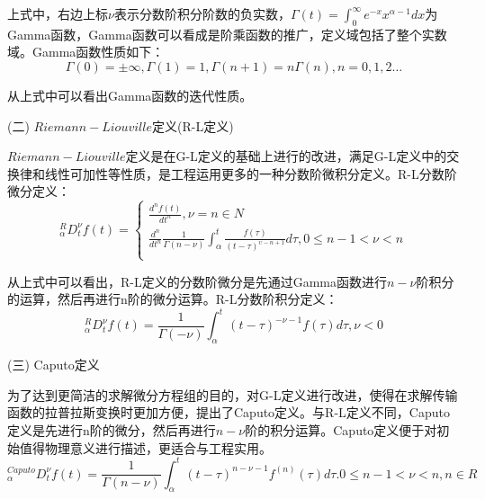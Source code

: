 上式中，右边上标$\nu$表示分数阶积分阶数的负实数，$\Gamma \left( t \right)=\int_{0}^{\infty }{{{e}^{-x}}{{x}^{\alpha -1}}dx}$为Gamma函数，Gamma函数可以看成是阶乘函数的推广，定义域包括了整个实数域。Gamma函数性质如下：
\begin{equation}
\Gamma \left( 0 \right)=\pm \infty ,\Gamma \left( 1 \right)=1,\Gamma \left( n+1 \right)=n\Gamma \left( n \right),n=0,1,2\ldots 
\end{equation}

从上式中可以看出Gamma函数的迭代性质。

(二) $Riemann-Liouville$定义(R-L定义)

$Riemann-Liouville$定义是在G-L定义的基础上进行的改进，满足G-L定义中的交换律和线性可加性等性质，是工程运用更多的一种分数阶微积分定义。R-L分数阶微分定义：
\begin{equation}
{}_{\alpha }^{R}D_{t}^{\nu }f(t)=\left\{ \begin{matrix}
   \frac{{{d}^{n}}f\left( t \right)}{d{{t}^{n}}},\nu =n\in N  \\
   \frac{{{d}^{n}}}{d{{t}^{n}}}\frac{1}{\Gamma \left( n-\nu  \right)}\int_{\alpha }^{t}{\frac{f\left( \tau  \right)}{{{\left( t-\tau  \right)}^{\upsilon -n+1}}}d\tau ,0\le n-1<\nu <n}  \\
\end{matrix} \right.
\end{equation}

从上式中可以看出，R-L定义的分数阶微分是先通过Gamma函数进行$n-\nu $阶积分的运算，然后再进行n阶的微分运算。R-L分数阶积分定义：
\begin{equation}
{}_{\alpha }^{R}D_{t}^{\nu }f(t)=\frac{1}{\Gamma \left( -\nu  \right)}\int_{\alpha }^{t}{{{\left( t-\tau  \right)}^{-\nu -1}}f\left( \tau  \right)}d\tau ,\nu <0
\end{equation}

(三)	Caputo定义

为了达到更简洁的求解微分方程组的目的，对G-L定义进行改进，使得在求解传输函数的拉普拉斯变换时更加方便，提出了Caputo定义。与R-L定义不同，Caputo定义是先进行n阶的微分，然后再进行$n-\nu $阶的积分运算。Caputo定义便于对初始值得物理意义进行描述，更适合与工程实用。
\begin{equation}
{}_{\alpha }^{Caputo}D_{t}^{\nu }f(t)=\frac{1}{\Gamma \left( n-\nu  \right)}\int_{\alpha }^{t}{{{\left( t-\tau  \right)}^{n-\nu -1}}{{f}^{\left( n \right)}}\left( \tau  \right)}d\tau .0\le n-1<\nu <n,n\in R
\end{equation}
